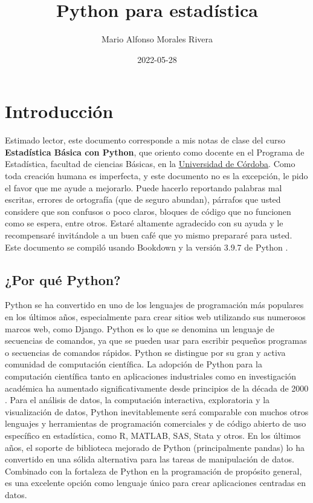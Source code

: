 \documentclass[
]{book}
\title{Python para estadística}
\author{Mario Alfonso Morales Rivera}
\date{2022-05-28}
\theoremstyle{definition}
\theoremstyle{definition}
\theoremstyle{definition}
\theoremstyle{definition}
\theoremstyle{remark}
\begin{document}
\maketitle

{
\setcounter{tocdepth}{1}
\tableofcontents
}
\hypertarget{introducciuxf3n}{%
\chapter{Introducción}\label{introducciuxf3n}}

Estimado lector, este documento corresponde a mis notas de clase del curso \textbf{Estadística Básica con Python}, que oriento como docente en el Programa de Estadística, facultad de ciencias Básicas, en la \href{https://www.unicordoba.edu.co}{Universidad de Córdoba}. Como toda creación humana es imperfecta, y este documento no es la excepción, le pido el favor que me ayude a mejorarlo. Puede hacerlo reportando palabras mal escritas, errores de ortografía (que de seguro abundan), párrafos que usted considere que son confusos o poco claros, bloques de código que no funcionen como se espera, entre otros. Estaré altamente agradecido con su ayuda y le recompensaré invitándole a un buen café que yo mismo prepararé para usted. Este documento se compiló usando Bookdown \citep{R-bookdown} y la versión 3.9.7 de Python \citep{van1995python}.

\hypertarget{por-quuxe9-python}{%
\section{¿Por qué Python?}\label{por-quuxe9-python}}

Python se ha convertido en uno de los lenguajes de programación más populares en los últimos años, especialmente para crear sitios web utilizando sus numerosos marcos web, como Django. Python es lo que se denomina un lenguaje de secuencias de comandos, ya que se pueden usar para escribir pequeños programas o secuencias de comandos rápidos. Python se distingue por su gran y activa comunidad de computación científica. La adopción de Python para la computación científica tanto en aplicaciones industriales como en investigación académica ha aumentado significativamente desde principios de la década de 2000 \citep{McKinney}.
Para el análisis de datos, la computación interactiva, exploratoria y la visualización de datos, Python inevitablemente será comparable con muchos otros lenguajes y herramientas de programación comerciales y de código abierto de uso específico en estadística, como R, MATLAB, SAS, Stata y otros. En los últimos años, el soporte de biblioteca mejorado de Python (principalmente pandas) lo ha convertido en una sólida alternativa para las tareas de manipulación de datos. Combinado con la fortaleza de Python en la programación de propósito general, es una excelente opción como lenguaje único para crear aplicaciones centradas en datos.
\end{document}
